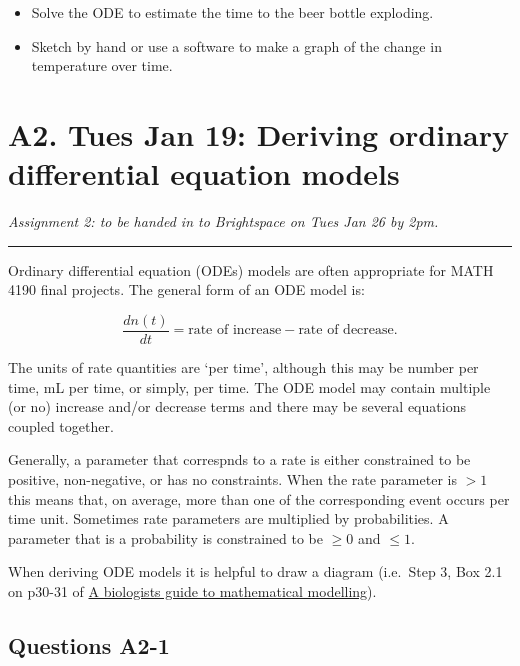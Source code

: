 \documentclass[]{book}
\begin{document}
\begin{itemize}
\item
  Solve the ODE to estimate the time to the beer bottle exploding.
\item
  Sketch by hand or use a software to make a graph of the change in
  temperature over time.
\end{itemize}

\chapter{A2. Tues Jan 19: Deriving ordinary differential equation
models}\label{a2.-tues-jan-19-deriving-ordinary-differential-equation-models}

\emph{Assignment 2: to be handed in to Brightspace on Tues Jan 26 by
2pm.}

\begin{center}\rule{0.5\linewidth}{0.5pt}\end{center}

Ordinary differential equation (ODEs) models are often appropriate for
MATH 4190 final projects. The general form of an ODE model is:

\begin{equation}\label{eq:genCT}
\frac{dn(t)}{dt} = \mbox{rate of increase} - \mbox{rate of decrease}.
\end{equation}

The units of rate quantities are `per time', although this may be number
per time, mL per time, or simply, per time. The ODE model may contain
multiple (or no) increase and/or decrease terms and there may be several
equations coupled together.

Generally, a parameter that correspnds to a rate is either constrained
to be positive, non-negative, or has no constraints. When the rate
parameter is \(>1\) this means that, on average, more than one of the
corresponding event occurs per time unit. Sometimes rate parameters are
multiplied by probabilities. A parameter that is a probability is
constrained to be \(\geq 0\) and \(\leq 1\).

When deriving ODE models it is helpful to draw a diagram (i.e.~Step 3,
Box 2.1 on p30-31 of
\href{https://ebookcentral-proquest-com.qe2a-proxy.mun.ca/lib/MUN/detail.action?docID=768551}{A
biologists guide to mathematical modelling}).

\section{Questions A2-1}\label{questions-a2-1}
\end{document}
